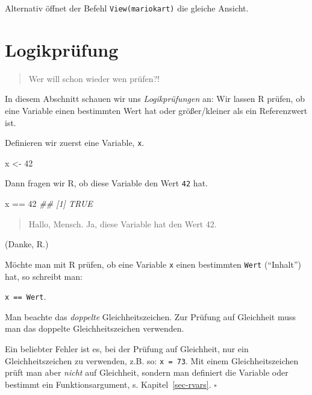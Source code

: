 \documentclass[
  letterpaper,
]{scrbook}
\newenvironment{Shaded}{\begin{snugshade}}{\end{snugshade}}
\newcommand{\DecValTok}[1]{\textcolor[rgb]{0.68,0.00,0.00}{#1}}
\newcommand{\DocumentationTok}[1]{\textcolor[rgb]{0.37,0.37,0.37}{\textit{#1}}}
\newcommand{\NormalTok}[1]{\textcolor[rgb]{0.00,0.23,0.31}{#1}}
\newcommand{\OtherTok}[1]{\textcolor[rgb]{0.00,0.23,0.31}{#1}}
\newcommand{\SpecialCharTok}[1]{\textcolor[rgb]{0.37,0.37,0.37}{#1}}
\theoremstyle{definition}
\theoremstyle{definition}
\theoremstyle{definition}
\theoremstyle{remark}
\begin{document}
Alternativ öffnet der Befehl \texttt{View(mariokart)} die gleiche
Ansicht.

\section{Logikprüfung}\label{sec-logic}

\begin{quote}
{} Wer will schon wieder wen prüfen?!
\end{quote}

In diesem Abschnitt schauen wir uns \emph{Logikprüfungen} an: Wir lassen
R prüfen, ob eine Variable einen bestimmten Wert hat oder größer/kleiner
als ein Referenzwert ist.

Definieren wir zuerst eine Variable, \texttt{x}.

\begin{Shaded}
\begin{Highlighting}[]
\NormalTok{x }\OtherTok{\textless{}{-}} \DecValTok{42}
\end{Highlighting}
\end{Shaded}

Dann fragen wir R, ob diese Variable den Wert \texttt{42} hat.

\begin{Shaded}
\begin{Highlighting}[]
\NormalTok{x }\SpecialCharTok{==} \DecValTok{42}
\DocumentationTok{\#\# [1] TRUE}
\end{Highlighting}
\end{Shaded}

\begin{quote}
{} Hallo, Mensch. Ja, diese Variable hat den Wert 42.
\end{quote}

(Danke, R.)

Möchte man mit R prüfen, ob eine Variable \texttt{x} einen bestimmten
\texttt{Wert} (\enquote{Inhalt}) hat, so schreibt man:

\texttt{x\ ==\ Wert}.

Man beachte das \emph{doppelte} Gleichheitszeichen. Zur Prüfung auf
Gleichheit muss man das doppelte Gleichheitszeichen verwenden.

\begin{tcolorbox}[enhanced jigsaw, colbacktitle=quarto-callout-caution-color!10!white, toptitle=1mm, colframe=quarto-callout-caution-color-frame, breakable, toprule=.15mm, bottomrule=.15mm, bottomtitle=1mm, left=2mm, opacitybacktitle=0.6, colback=white, arc=.35mm, coltitle=black, title=\textcolor{quarto-callout-caution-color}{\faFire}\hspace{0.5em}{Vorsicht}, opacityback=0, rightrule=.15mm, leftrule=.75mm, titlerule=0mm]

Ein beliebter Fehler ist es, bei der Prüfung auf Gleichheit, nur ein
Gleichheitszeichen zu verwenden, z.B. so: \texttt{x\ =\ 73}. Mit einem
Gleichheitszeichen prüft man aber \emph{nicht} auf Gleichheit, sondern
man definiert die Variable oder bestimmt ein Funktionsargument, s.
Kapitel~\ref{sec-rvars}. \(\square\)

\end{tcolorbox}
\end{document}
